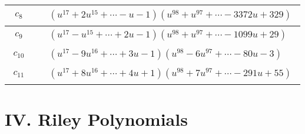 \documentclass[1p]{elsarticle_modified}
\theoremstyle{definition}
\begin{document}
\begin{tabular}{m{50pt}|m{274pt}}
\hline $$\begin{aligned}c_{8}\end{aligned}$$&$\begin{aligned}
&(u^{17}+2 u^{15}+\cdots- u-1)(u^{98}+u^{97}+\cdots-3372 u+329)
\end{aligned}$\\
\hline $$\begin{aligned}c_{9}\end{aligned}$$&$\begin{aligned}
&(u^{17}- u^{15}+\cdots+2 u-1)(u^{98}+u^{97}+\cdots-1099 u+29)
\end{aligned}$\\
\hline $$\begin{aligned}c_{10}\end{aligned}$$&$\begin{aligned}
&(u^{17}-9 u^{16}+\cdots+3 u-1)(u^{98}-6 u^{97}+\cdots-80 u-3)
\end{aligned}$\\
\hline $$\begin{aligned}c_{11}\end{aligned}$$&$\begin{aligned}
&(u^{17}+8 u^{16}+\cdots+4 u+1)(u^{98}+7 u^{97}+\cdots-291 u+55)
\end{aligned}$\\
\hline
\end{tabular}\newpage\renewcommand{\arraystretch}{1}
\centering \section*{ IV. Riley Polynomials}
\end{document}
